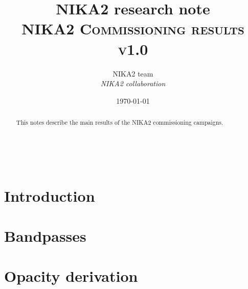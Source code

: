\documentclass[a4paper, 11pt]{article} %
\title{\textbf{NIKA2 research note}\\   
\textsc{NIKA2 Commissioning results v1.0}} %
\author{NIKA2 team %
\\{\textit{NIKA2 collaboration}}} %
\date{\today} %
\makeatletter
\renewcommand{\maketitle}{ %
\begin{flushleft} %
{\LARGE\@title} %

\vspace{50pt} %

{\large\@author} %
\\\@date %

\vspace{40pt} %
\end{flushleft}
}
\makeatother
\begin{document}
\maketitle %
%
%
%
\tableofcontents

\newpage
\begin{abstract}
This notes describe the main results of the NIKA2 commissioning campaigns.
\end{abstract}



\newpage
%
%



\section{Introduction}
\label{se:intro}




\section{Bandpasses}
\label{se:bandpasses}


\clearpage
\section{Opacity derivation}
\label{se:opacities}


\end{document}
